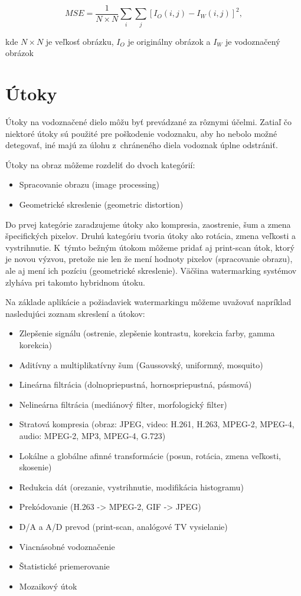 \begin{equation}
MSE = \frac{1}{N\times N} \sum_i \sum_j[I_O(i,j) - I_W(i,j)]^2,
\end{equation}

kde $N\times N$ je veľkosť obrázku, $I_O$ je originálny obrázok a $I_W$ je vodoznačený obrázok \cite{QRdecomposition}

\section{Útoky}
Útoky na vodoznačené dielo môžu byť prevádzané za rôznymi účelmi. Zatiaľ čo niektoré útoky sú použité pre poškodenie vodoznaku, aby ho nebolo možné detegovať, iné majú za úlohu z~chráneného diela vodoznak úplne odstrániť.

Útoky na obraz môžeme rozdeliť do dvoch kategórií:
\begin{itemize}
\item Spracovanie obrazu (image processing)
\item Geometrické skreslenie (geometric distortion)
\end{itemize}

Do prvej kategórie zaradzujeme útoky ako kompresia, zaostrenie, šum a zmena špecifických pixelov. Druhú kategóriu tvoria útoky ako rotácia, zmena veľkosti a vystrihnutie. K~týmto bežným útokom môžeme pridať aj print-scan útok, ktorý je novou výzvou, pretože nie len že mení hodnoty pixelov (spracovanie obrazu), ale aj mení ich pozíciu (geometrické skreslenie). Väčšina watermarking systémov zlyháva pri takomto hybridnom útoku. \cite{Chen}

Na základe aplikácie a požiadaviek watermarkingu môžeme uvažovať napríklad nasledujúci zoznam skreslení a útokov: \cite{Katzenbeisser}

\begin{itemize}
\item	Zlepšenie signálu (ostrenie, zlepšenie kontrastu, korekcia farby, gamma korekcia)
\item	Aditívny a multiplikatívny šum (Gaussovský, uniformný, mosquito)
\item	Lineárna filtrácia (dolnopriepustná, hornospriepustná, pásmová)
\item	Nelineárna filtrácia (mediánový filter, morfologický filter)
\item	Stratová kompresia (obraz: JPEG, video: H.261, H.263, MPEG-2, MPEG-4, audio: MPEG-2, MP3, MPEG-4, G.723)
\item	Lokálne a globálne afinné transformácie (posun, rotácia, zmena veľkosti, skosenie)
\item	Redukcia dát (orezanie, vystrihnutie, modifikácia histogramu)
\item	Prekódovanie (H.263 -> MPEG-2, GIF -> JPEG)
\item	D/A a A/D prevod (print-scan, analógové TV vysielanie)
\item	Viacnásobné vodoznačenie
\item	Štatistické priemerovanie
\item	Mozaikový útok
\end{itemize}

